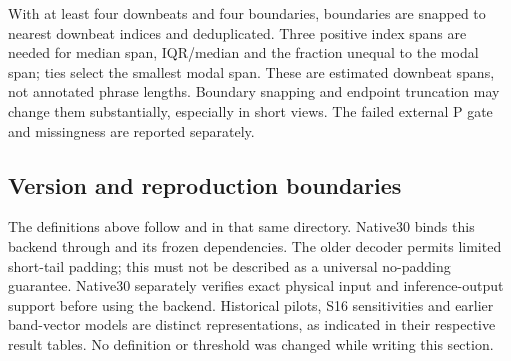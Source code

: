 With at least four downbeats and four boundaries, boundaries are snapped
to nearest downbeat indices and deduplicated. Three positive index spans
are needed for median span, IQR/median and the fraction unequal to the
modal span; ties select the smallest modal span. These are estimated
downbeat spans, not annotated phrase lengths. Boundary snapping and
endpoint truncation may change them substantially, especially in short
views. The failed external P gate and missingness are reported separately.

\subsection{Version and reproduction boundaries}
\begingroup\raggedright
The definitions above follow
and  in that same directory.
Native30 binds this backend through
and its frozen dependencies. The older decoder permits limited short-tail
padding; this must not be described as a universal no-padding guarantee.
Native30 separately verifies exact physical input and inference-output
support before using the backend. Historical pilots, S16 sensitivities
and earlier band-vector models are distinct representations, as indicated
in their respective result tables. No definition or threshold was changed
while writing this section.\par
\endgroup
